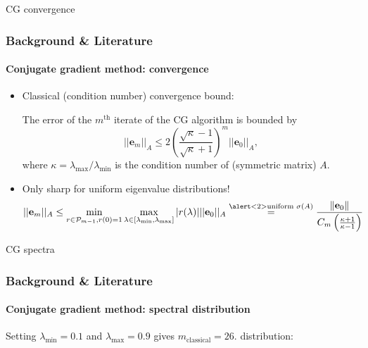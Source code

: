 \begin{frame}[label=background,fragile]{CG convergence}
    \frametitle{Background \& Literature}
    \framesubtitle{Conjugate gradient method: convergence}
    \begin{itemize}
        \item<1-> Classical (condition number) convergence bound:
        \begin{theorem}
            The error of the $m^{\text{th}}$ iterate of the CG algorithm is bounded by
            \begin{equation*}
            ||\mathbf{e}_m||_A \leq 2 \left(\frac{\sqrt{\kappa}-1}{\sqrt{\kappa} + 1}\right)^m ||\mathbf{e}_0||_A,
            \end{equation*}
            where $\kappa = \lambda_{\text{max}}/\lambda_{\text{min}}$ is the condition number of (symmetric matrix) $A$.
        \end{theorem}
        \item<2-> Only sharp for \alert<2>{uniform} eigenvalue distributions!
        \begin{equation*}
            ||\mathbf{e}_m||_A \leq \min_{r \in \mathcal{P}_{m-1}, r(0) = 1} \max_{\lambda \in [\lambda_{\text{min}}, \lambda_{\text{max}}]} |r(\lambda)| ||\mathbf{e}_0||_A \overset{\alert<2>{\text{uniform } \sigma(A)}}{=} \frac{\|\mathbf{e}_0\|}{C_m\left(\frac{\kappa + 1}{\kappa - 1}\right)}
        \end{equation*}
    \end{itemize}
\end{frame}

\begin{frame}[label=background,fragile]{CG spectra}
    \frametitle{Background \& Literature}
    \framesubtitle{Conjugate gradient method: spectral distribution}
    Setting $\lambda_{\text{min}} = 0.1$ and $\lambda_{\text{max}} = 0.9$ gives $m_{\text{classical}} = 26$.  distribution:
\end{frame}

